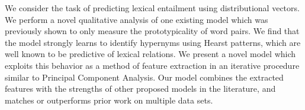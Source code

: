 We consider the task of predicting lexical entailment using distributional vectors. We perform a novel qualitative analysis of one existing model which was previously shown to only measure the prototypicality of word pairs. We find that the model strongly learns to identify hypernyms using Hearst patterns, which are well known to be predictive of lexical relations. We present a novel model which exploits this behavior as a method of feature extraction in an iterative procedure similar to Principal Component Analysis. Our model combines the extracted features with the strengths of other proposed models in the literature, and matches or outperforms prior work on multiple data sets.
